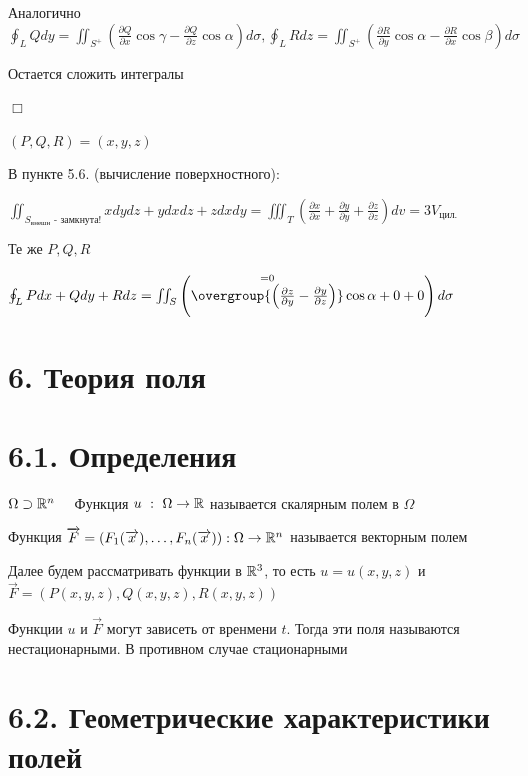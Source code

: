 \documentclass[12pt]{article}
\begin{document}
    Аналогично $\oint_L Qdy = \iint_{S^+} \left(\frac{\partial Q}{\partial x}\cos\gamma - \frac{\partial Q}{\partial z}\cos\alpha\right) d\sigma,
    \oint_L Rdz = \iint_{S^+} \left(\frac{\partial R}{\partial y}\cos\alpha - \frac{\partial R}{\partial x}\cos\beta\right) d\sigma$

    Остается сложить интегралы

    $\Box$

     $(P, Q, R) = (x, y, z)$

    В \Exs пункте 5.6. (вычисление поверхностного):

    $\iint_{S_{\text{внешн}} \text{ - замкнута!}} xdydz + ydxdz + zdxdy = \iiint_T \left(\frac{\partial x}{\partial x} + \frac{\partial y}{\partial y} + \frac{\partial z}{\partial z}\right) dv = 3V_{\text{цил.}}$

     Те же $P, Q, R$

    $\oint_L Pdx + Qdy + Rdz = \iint_{S} \left(\overset{= 0}{\overgroup{\left(\frac{\partial z}{\partial y} - \frac{\partial y}{\partial z}\right)}} \cos\alpha + 0 + 0\right) d\sigma$

    \clearpage


    \section{6. Теория поля}


    \section{6.1. Определения}

     $\Omega \supset \mathbb{R}^n \quad$ Функция $u \ : \ \Omega \to \mathbb{R}$ называется скалярным полем в $\Omega$

     Функция $\overrightarrow{F} = (F_1(\overrightarrow{x}), \dots, F_n(\overrightarrow{x})) : \Omega \to \mathbb{R}^n$ называется векторным полем

    \Nota Далее будем рассматривать функции в $\mathbb{R}^3$, то есть $u = u(x, y, z)$ и $\overrightarrow{F} = (P(x, y, z), Q(x, y, z), R(x, y, z))$

    \Nota Функции $u$ и $\overrightarrow{F}$ могут зависеть от вренмени $t$. Тогда эти поля называются нестационарными. В противном случае стационарными


    \section{6.2. Геометрические характеристики полей}
\end{document}
